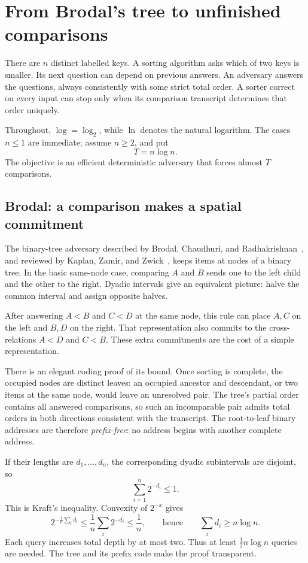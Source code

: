 \section{From Brodal's tree to unfinished comparisons}\label{sec:classical}

There are \(n\) distinct labelled keys. A sorting algorithm asks which of two keys is smaller. Its next question can depend on previous answers. An adversary answers the questions, always consistently with some strict total order. A sorter correct on every input can stop only when its comparison transcript determines that order uniquely.

Throughout, \(\log=\log_2\), while \(\ln\) denotes the natural logarithm. The cases \(n\le1\) are immediate; assume \(n\ge2\), and put
\[
T=n\log n.
\]
The objective is an efficient deterministic adversary that forces almost \(T\) comparisons.

\subsection{Brodal: a comparison makes a spatial commitment}

The binary-tree adversary described by Brodal, Chaudhuri, and Radhakrishnan~\cite{brodal}, and reviewed by Kaplan, Zamir, and Zwick~\cite{kzz}, keeps items at nodes of a binary tree. In the basic same-node case, comparing \(A\) and \(B\) sends one to the left child and the other to the right. Dyadic intervals give an equivalent picture: halve the common interval and assign opposite halves.

After answering \(A<B\) and \(C<D\) at the same node, this rule can place \(A,C\) on the left and \(B,D\) on the right. That representation also commits to the cross-relations \(A<D\) and \(C<B\). These extra commitments are the cost of a simple representation.

There is an elegant coding proof of its bound. Once sorting is complete, the occupied nodes are distinct leaves: an occupied ancestor and descendant, or two items at the same node, would leave an unresolved pair. The tree's partial order contains all answered comparisons, so such an incomparable pair admits total orders in both directions consistent with the transcript. The root-to-leaf binary addresses are therefore \emph{prefix-free}: no address begins with another complete address.

If their lengths are \(d_1,\ldots,d_n\), the corresponding dyadic subintervals are disjoint, so
\[
\sum_{i=1}^n2^{-d_i}\le1.
\]
This is Kraft's inequality. Convexity of \(2^{-x}\) gives
\[
2^{-\frac1n\sum_i d_i}
\le\frac1n\sum_i2^{-d_i}\le\frac1n,
\qquad\text{hence}\qquad
\sum_i d_i\ge n\log n.
\]
Each query increases total depth by at most two. Thus at least \(\tfrac12 n\log n\) queries are needed. The tree and its prefix code make the proof transparent.

